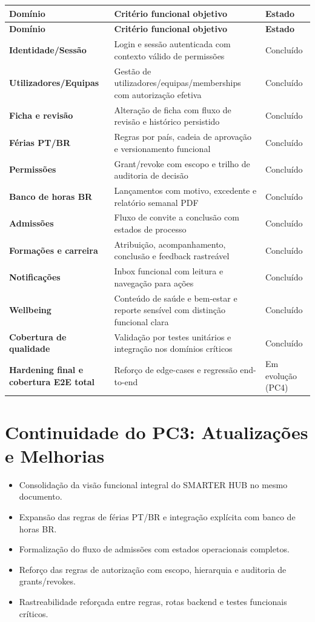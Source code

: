 \documentclass[11pt,a4paper,twoside]{article}
\newcommand{\tH}[1]{\textbf{\sffamily\small\color{white}#1}}
\newcommand{\theadrow}{\rowcolor{ACCENT}}
\begin{document}
\begin{longtable}{>{\small\bfseries}p{3.5cm} >{\small}p{6.1cm} >{\small\centering\arraybackslash}p{2.5cm}}
\theadrow
\tH{Domínio} & \tH{Critério funcional objetivo} & \tH{Estado} \\
\midrule
\endfirsthead
\theadrow
\tH{Domínio} & \tH{Critério funcional objetivo} & \tH{Estado} \\
\midrule
\endhead
Identidade/Sessão & Login e sessão autenticada com contexto válido de permissões & Concluído \\
Utilizadores/Equipas & Gestão de utilizadores/equipas/memberships com autorização efetiva & Concluído \\
Ficha e revisão & Alteração de ficha com fluxo de revisão e histórico persistido & Concluído \\
Férias PT/BR & Regras por país, cadeia de aprovação e versionamento funcional & Concluído \\
Permissões & Grant/revoke com escopo e trilho de auditoria de decisão & Concluído \\
Banco de horas BR & Lançamentos com motivo, excedente e relatório semanal PDF & Concluído \\
Admissões & Fluxo de convite a conclusão com estados de processo & Concluído \\
Formações e carreira & Atribuição, acompanhamento, conclusão e feedback rastreável & Concluído \\
Notificações & Inbox funcional com leitura e navegação para ações & Concluído \\
Wellbeing & Conteúdo de saúde e bem-estar e reporte sensível com distinção funcional clara & Concluído \\
Cobertura de qualidade & Validação por testes unitários e integração nos domínios críticos & Concluído \\
Hardening final e cobertura E2E total & Reforço de edge-cases e regressão end-to-end & Em evolução (PC4) \\
\bottomrule
\end{longtable}

\section{Continuidade do PC3: Atualizações e Melhorias}

\begin{itemize}
  \item Consolidação da visão funcional integral do SMARTER HUB no mesmo documento.
  \item Expansão das regras de férias PT/BR e integração explícita com banco de horas BR.
  \item Formalização do fluxo de admissões com estados operacionais completos.
  \item Reforço das regras de autorização com escopo, hierarquia e auditoria de grants/revokes.
  \item Rastreabilidade reforçada entre regras, rotas backend e testes funcionais críticos.
\end{itemize}
\end{document}

